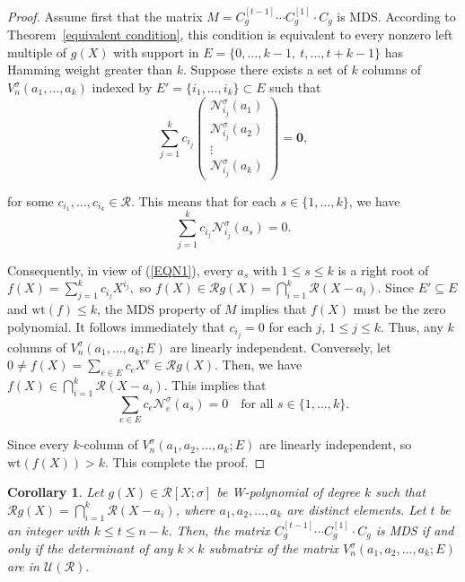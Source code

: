 \documentclass[11pt]{article}
\newtheorem{corollary}{Corollary}
\begin{document}
\begin{proof}
Assume first that the matrix 
\(
M = C_g^{[t-1]} \cdots C^{[1]}_g \cdot C_g
\) 
is MDS. According to Theorem~\ref{equivalent condition}, this condition is equivalent to every nonzero left multiple of $g(X)$ with support in 
\(
E = \{0, \dots, k-1,~t, \dots, t+k-1\}
\) 
has Hamming weight greater than $k$.   Suppose there exists a set of $k$ columns of $V^\sigma_n(a_1, \dots, a_k)$ indexed by $E' = \{i_1, \dots, i_k\} \subset E$ such that  
\[
\sum_{j=1}^{k} c_{i_j} 
\begin{pmatrix}
\mathcal{N}^\sigma_{i_j}(a_1) \\ 
\mathcal{N}^\sigma_{i_j}(a_2) \\ 
\vdots \\ 
\mathcal{N}^\sigma_{i_j}(a_k)
\end{pmatrix} 
= \mathbf{0},
\]

for some $c_{i_1}, \dots, c_{i_k} \in \mathcal{R}$.  
This means that for each $s \in \{1, \dots, k\}$, we have 
\[
\sum_{j=1}^{k} c_{i_j} \mathcal{N}^\sigma_{i_j}(a_s) = 0.
\]

Consequently, in view of (\ref{EQN1}), every $a_s$ with $1 \leq s \leq k$ is a right root of
\(
f(X) = \sum_{j=1}^{k} c_{i_j} X^{i_j},
\)
so $f(X) \in \mathcal{R} g(X) = \bigcap_{i=1}^k \mathcal{R}(X - a_i)$. Since $E' \subseteq E$ and $\mathrm{wt}(f) \leq k$, the MDS property of $M$ implies that $f(X)$ must be the zero polynomial. It follows immediately that $c_{i_j} = 0$ for each $j$, $1\leq j\leq k$. Thus, any $k$ columns of $V^\sigma_n(a_1, \dots, a_k;E)$ are linearly independent.  Conversely,  let  
\(
0\neq f(X) = \sum_{e \in E} c_e X^e \in \mathcal{R} g(X).
\)  
Then, we have $f(X) \in \bigcap_{i=1}^k \mathcal{R}(X-a_i)$.  This implies that 
\[
\sum_{e\in E} c_{e} \mathcal{N}^\sigma_{e}(a_s) = 0 
\quad \text{for all } s \in \{1, \dots, k\}.
\]

Since every $k$-column of $V^\sigma_n(a_1,a_2,\dots,a_k;E)$ are linearly independent, so $\mathrm{wt}(f(X))>k.$ This complete the proof.
\end{proof}
\begin{corollary}\label{Corollarymain}
    Let  $g( X )\in \mathcal{R}[X;\sigma]$ be W-polynomial of degree $k$ such that 	\(
	\mathcal{R} g(X) = \bigcap_{i=1}^k \mathcal{R}(X - a_i)
	\), where  $a_1,a_2,\dots ,a_{k}$ are distinct elements. Let $t$ be an integer with $k\leq t \leq n-k$. Then, the matrix $C^{[t-1]}_g\cdots C^{[1]}_g\cdot C_g$ is MDS if and only if the determinant of any $k\times k$ submatrix of the matrix $ V^{\sigma}_n(a_1,a_2,\dots,a_k;E)$  are in $\mathcal{U}(\mathcal{R}).$
\end{corollary}
\end{document}
